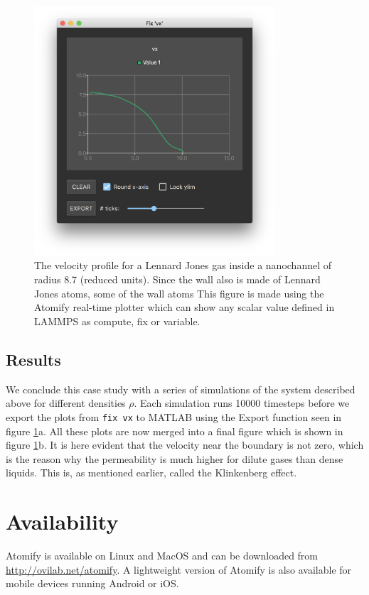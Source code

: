 \documentclass[12pt,a4paper,final]{iopart}
\newcommand{\code}[1]{\colorbox{light-gray}{\color{RawSienna}\texttt{#1}}}
\begin{document}
\begin{figure}
	\centering
	\includegraphics[width=0.8\textwidth]{lj_flow/08_velocity_profile1.png}
	\caption{
		The velocity profile for a Lennard Jones gas inside a nanochannel of radius 8.7 (reduced units).
		Since the wall also is made of Lennard Jones atoms, some of the wall atoms
		This figure is made using the Atomify real-time plotter which can show any scalar value defined in LAMMPS
		as compute, fix or variable.
    }
	\label{fig:velocity_profile1}
\end{figure}
\subsection{Results}
We conclude this case study with a series of simulations of the system described above for different densities $\rho$.
Each simulation runs 10000 timesteps before we export the plots from \code{fix vx} to MATLAB using the Export function seen in figure \ref{fig:velocity_profile1}a.
All these plots are now merged into a final figure which is shown in figure \ref{fig:velocity_profile1}b.
It is here evident that the velocity near the boundary is not zero, which is the reason why the permeability is much higher for dilute gases than dense liquids.
This is, as mentioned earlier, called the Klinkenberg effect\cite{klinkenberg1941permeability}.

\section{Availability}
Atomify is available on Linux and MacOS and can be downloaded from
\href{https://ovilab.net/atomify}{http://ovilab.net/atomify}.
A lightweight version of Atomify is also available for mobile devices running
Android or iOS.
\end{document}
